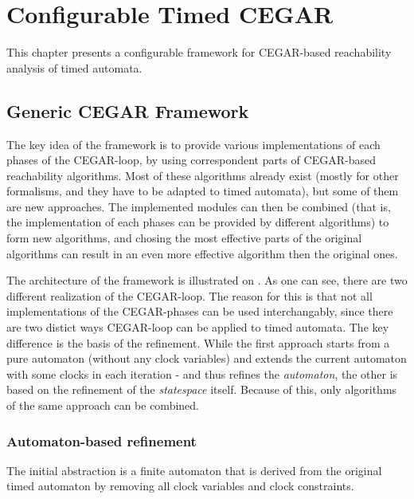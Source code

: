 \chapter{Configurable Timed CEGAR} \label{chap:timed_cegar}

This chapter presents a configurable framework for CEGAR-based reachability analysis of timed automata. 

\section{Generic CEGAR Framework}

The key idea of the framework is to provide various implementations of each phases of the CEGAR-loop, by using correspondent parts of CEGAR-based reachability algorithms. Most of these algorithms already exist (mostly for other formalisms, and they have to be adapted to timed automata), but some of them are new approaches. The implemented modules can then be combined (that is, the implementation of each phases can be provided by different algorithms) to form new algorithms, and chosing the most effective parts of the original algorithms can result in an even more effective algorithm then the original ones. 

The architecture of the framework is illustrated on . As one can see, there are two different realization of the CEGAR-loop. The reason for this is that not all implementations of the CEGAR-phases can be used interchangably, since there are two distict ways CEGAR-loop can be applied to timed automata. The key difference is the basis of the refinement. While the first approach  starts from a pure automaton (without any clock variables) and extends the current automaton with some clocks in each iteration  - and thus refines the \emph{automaton}, the other  is based on the refinement of the \emph{statespace} itself. Because of this, only algorithms of the same approach can be combined.

\subsection{Automaton-based refinement}

 The initial abstraction is a finite automaton that is derived from the original timed automaton by removing all clock variables and clock constraints. 

